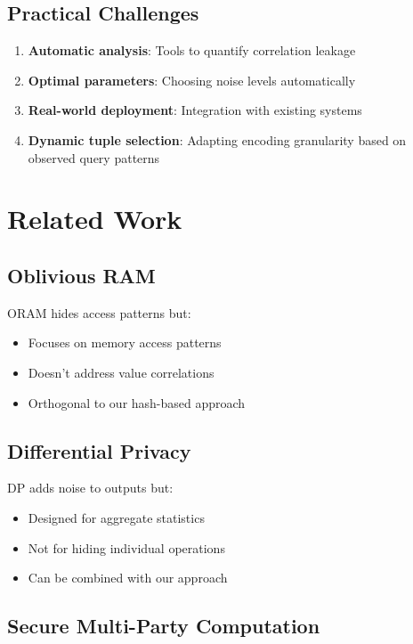 \documentclass[11pt,final]{article}
\begin{document}
\subsection{Practical Challenges}

\begin{enumerate}
    \item \textbf{Automatic analysis}: Tools to quantify correlation leakage
    \item \textbf{Optimal parameters}: Choosing noise levels automatically
    \item \textbf{Real-world deployment}: Integration with existing systems
    \item \textbf{Dynamic tuple selection}: Adapting encoding granularity based on observed query patterns
\end{enumerate}

\section{Related Work}

\subsection{Oblivious RAM}

ORAM hides access patterns but:
\begin{itemize}
    \item Focuses on memory access patterns
    \item Doesn't address value correlations
    \item Orthogonal to our hash-based approach
\end{itemize}

\subsection{Differential Privacy}

DP adds noise to outputs but:
\begin{itemize}
    \item Designed for aggregate statistics
    \item Not for hiding individual operations
    \item Can be combined with our approach
\end{itemize}

\subsection{Secure Multi-Party Computation}
\end{document}
